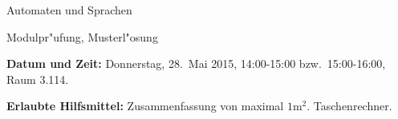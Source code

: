 %
%
%


\pagestyle{fancy}
\phantom{a}
\vspace{0.8cm}

\begin{center}
{\LARGE Automaten und Sprachen}

\vspace{1cm}
{\Large Modulpr"ufung, Musterl"osung}
\vspace{3cm}
\end{center}

{\parindent 0pt
{\bf Datum und Zeit:}
Donnerstag, 28.~Mai 2015, 14:00-15:00 bzw.~15:00-16:00, Raum 3.114.

{\bf Erlaubte Hilfsmittel:} Zusammenfassung von maximal $1\text{m}^2$.
Taschenrechner.

}





